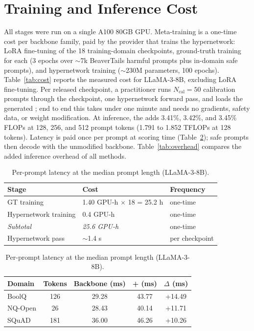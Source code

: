 \section{Training and Inference Cost}
\label{app:cost}
All stages were run on a single A100 80GB GPU. Meta-training is a one-time cost per backbone family, paid by the provider that trains the hypernetwork: LoRA fine-tuning of the 18 training-domain checkpoints, ground-truth \ssn{} training for each (3 epochs over $\sim$7k BeaverTails harmful prompts plus in-domain safe prompts), and hypernetwork training ($\sim$230M parameters, 100 epochs). Table~\ref{tab:cost} reports the measured cost for LLaMA-3-8B, excluding LoRA fine-tuning. Per released checkpoint, a practitioner runs $N_\text{cal}{=}50$ calibration prompts through the checkpoint, one hypernetwork forward pass, and loads the generated \ssn{}; end to end this takes under one minute and needs no gradients, safety data, or weight modification. At inference, the \ssn{} adds 3.41\%, 3.42\%, and 3.45\% FLOPs at 128, 256, and 512 prompt tokens (1.791 to 1.852 TFLOPs at 128 tokens). Latency is paid once per prompt at scoring time (Table~\ref{tab:latency}); safe prompts then decode with the unmodified backbone. Table~\ref{tab:overhead} compares the added inference overhead of all methods.

\begin{table}[htbp]
\centering
\begin{minipage}[t]{\linewidth}
\centering
\caption{Meta-training and deployment cost (LLaMA-3-8B, one A100).}
\label{tab:cost}
\small
\setlength{\tabcolsep}{3pt}
\begin{tabular}{@{}lll@{}}
\toprule
\textbf{Stage} & \textbf{Cost} & \textbf{Frequency} \\
\midrule
GT \ssn{} training & 1.40 GPU-h $\times$ 18 = 25.2 h & one-time \\
Hypernetwork training & 0.4 GPU-h & one-time \\
\textit{Subtotal} & \textit{25.6 GPU-h} & one-time \\
\midrule
Hypernetwork pass & $\sim$1.4 s & per checkpoint \\
\bottomrule
\end{tabular}
\end{minipage}
\vspace{8pt}

\begin{minipage}[t]{\linewidth}
\centering
\caption{Per-prompt latency at the median prompt length (LLaMA-3-8B).}
\label{tab:latency}
\small
\setlength{\tabcolsep}{3pt}
\begin{tabular}{@{}lcccc@{}}
\toprule
\textbf{Domain} & \textbf{Tokens} & \textbf{Backbone (ms)} & \textbf{+\ssn{} (ms)} & $\Delta$ \textbf{(ms)} \\
\midrule
BoolQ   & 126 & 29.28 & 43.77 & +14.49 \\
NQ-Open & 26  & 28.43 & 40.14 & +11.71 \\
SQuAD   & 181 & 36.00 & 46.26 & +10.26 \\
\bottomrule
\end{tabular}
\end{minipage}
\end{table}

